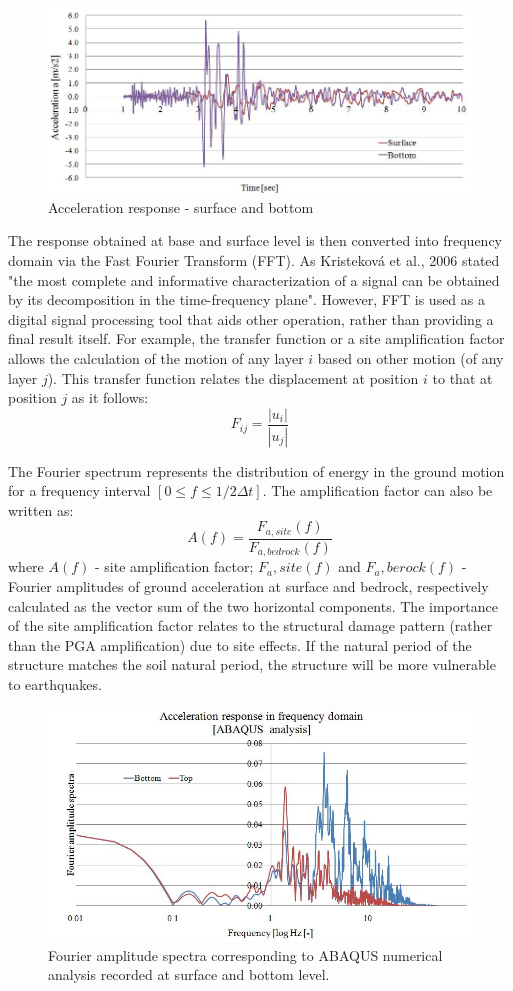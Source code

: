 	\begin{figure}[h!]
		\centering
		\includegraphics[width=0.7\linewidth]{"acc_response2"}
		\caption{Acceleration response - surface and bottom}
		\label{acc_resp2}
	\end{figure}
	The response obtained at base and surface level is then converted into frequency domain via the Fast Fourier Transform (FFT). As Kristeková et al., 2006 \cite{kristekova2006misfit} stated "the most complete and informative characterization of a signal can be obtained by its decomposition in the time-frequency plane". However, FFT is used as a digital signal processing tool that aids other operation, rather than providing a final result itself. For example, the transfer function or a site amplification factor allows the calculation of the motion of any layer $i$ based on other motion (of any layer $j$). This transfer function relates the displacement at position $i$ to that at position $j$ as it follows:
	\begin{equation}
	F_{ij}=\frac{|u_i|}{|u_j|}
	\end{equation}
	
	The Fourier spectrum represents the distribution of energy in the ground motion for a frequency interval $[0 ≤ f ≤ 1/2\Delta t]$. The amplification factor can also be written as:
	\begin{equation}
	A(f)=\frac{F_{a,site}(f)}{F_{a,bedrock}(f)}
	\end{equation}
	where $A(f)$ - site amplification factor; $F_a,site(f)$ and $F_a,berock(f)$ - Fourier amplitudes of ground acceleration at surface and bedrock, respectively calculated as the vector sum of the two horizontal components. The importance of the site amplification factor relates to the structural damage pattern (rather than the PGA amplification) due to site effects. If the natural period of the structure matches the soil natural period, the structure will be more vulnerable to earthquakes. 
	\begin{figure}[h!]
		\centering
		\includegraphics[width=0.7\linewidth]{"Fourier"}
		\caption{Fourier amplitude spectra corresponding to ABAQUS numerical analysis recorded at surface and bottom level.}
		\label{fourier}
	\end{figure}
	
